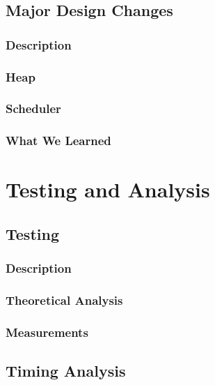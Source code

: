 \documentclass[12pt]{report}
\begin{document}
\chapter{Major Design Changes}

\section{Description}

\section{Heap}

\section{Scheduler}

\section{What We Learned}



\part{Testing and Analysis}


\chapter{Testing}

\section{Description}

\section{Theoretical Analysis}

\section{Measurements}



\chapter{Timing Analysis}
\end{document}
